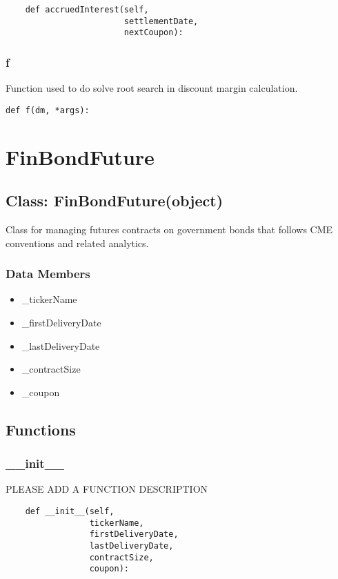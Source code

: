 \documentclass[twoside,11pt]{book}
\begin{document}
\begin{lstlisting}
    def accruedInterest(self,
                        settlementDate,
                        nextCoupon):
\end{lstlisting}

\subsubsection*{{\bf f}}
Function used to do solve root search in discount margin calculation.  

\begin{lstlisting}
def f(dm, *args):
\end{lstlisting}

\newpage
\section{FinBondFuture}

\subsection*{Class: FinBondFuture(object)}
Class for managing futures contracts on government bonds that follows CME conventions and related analytics.  

\subsubsection*{Data Members}
\begin{itemize}
\item{\_tickerName}
\item{\_firstDeliveryDate}
\item{\_lastDeliveryDate}
\item{\_contractSize}
\item{\_coupon}
\end{itemize}

\subsection*{Functions}

\subsubsection*{{\bf \_\_init\_\_}}
PLEASE ADD A FUNCTION DESCRIPTION

\begin{lstlisting}
    def __init__(self,
                 tickerName,
                 firstDeliveryDate,
                 lastDeliveryDate,
                 contractSize,
                 coupon):
\end{lstlisting}
\end{document}
